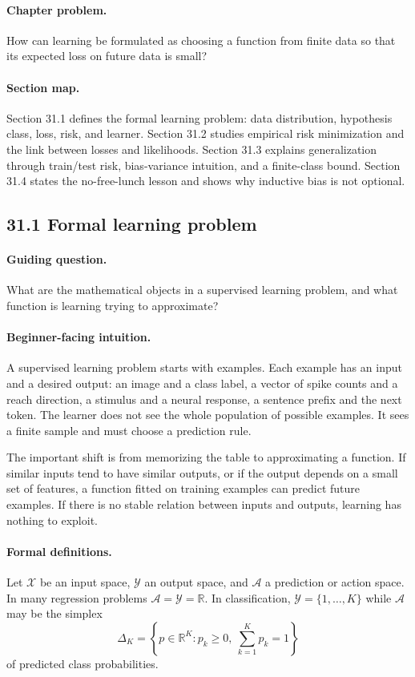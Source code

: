 \paragraph{Chapter problem.}
How can learning be formulated as choosing a function from finite data so that its expected loss on future data is small?

\paragraph{Section map.}
Section 31.1 defines the formal learning problem: data distribution, hypothesis class, loss, risk, and learner. Section 31.2 studies empirical risk minimization and the link between losses and likelihoods. Section 31.3 explains generalization through train/test risk, bias-variance intuition, and a finite-class bound. Section 31.4 states the no-free-lunch lesson and shows why inductive bias is not optional.

\subsection{31.1 Formal learning problem}

\paragraph{Guiding question.}
What are the mathematical objects in a supervised learning problem, and what function is learning trying to approximate?

\paragraph{Beginner-facing intuition.}
A supervised learning problem starts with examples. Each example has an input and a desired output: an image and a class label, a vector of spike counts and a reach direction, a stimulus and a neural response, a sentence prefix and the next token. The learner does not see the whole population of possible examples. It sees a finite sample and must choose a prediction rule.

The important shift is from memorizing the table to approximating a function. If similar inputs tend to have similar outputs, or if the output depends on a small set of features, a function fitted on training examples can predict future examples. If there is no stable relation between inputs and outputs, learning has nothing to exploit.

\paragraph{Formal definitions.}
Let \(\mathcal X\) be an input space, \(\mathcal Y\) an output space, and \(\mathcal A\) a prediction or action space. In many regression problems \(\mathcal A=\mathcal Y=\mathbb R\). In classification, \(\mathcal Y=\{1,\ldots,K\}\) while \(\mathcal A\) may be the simplex
\[
\Delta_K=\left\{p\in\mathbb R^K:p_k\geq0,\ \sum_{k=1}^K p_k=1\right\}
\]
of predicted class probabilities.

